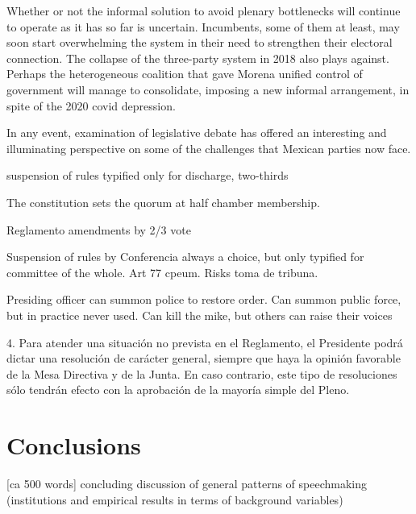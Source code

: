 \documentclass[letter,12pt]{article}
\begin{document}
Whether or not the informal solution to avoid plenary bottlenecks will continue to operate as it has so far is uncertain. Incumbents, some of them at least, may soon start overwhelming the system in their need to strengthen their electoral connection. The collapse of the three-party system in 2018 also plays against. Perhaps the heterogeneous coalition that gave Morena unified control of government will manage to consolidate, imposing a new informal arrangement, in spite of the 2020 covid depression.

In any event, examination of legislative debate has offered an interesting and illuminating perspective on some of the challenges that Mexican parties now face.   
  
suspension of rules typified only for discharge, two-thirds

The constitution sets the quorum at half chamber membership.

Reglamento amendments by 2/3 vote

Suspension of rules by Conferencia always a choice, but only typified for committee of the whole. Art 77 cpeum. Risks toma de tribuna.

Presiding officer can summon police to restore order. 
Can summon public force, but in practice never used. 
Can kill the mike, but others can raise their voices

4. Para atender una situación no prevista en el Reglamento, el Presidente podrá dictar una resolución de carácter general, siempre que haya la opinión favorable de la Mesa Directiva y de la Junta. En caso contrario, este tipo de resoluciones sólo tendrán efecto con la aprobación de la mayoría simple del Pleno.



\section{Conclusions} [ca 500 words]
concluding discussion of general patterns of speechmaking (institutions and empirical results in terms of background variables)
\end{document}
